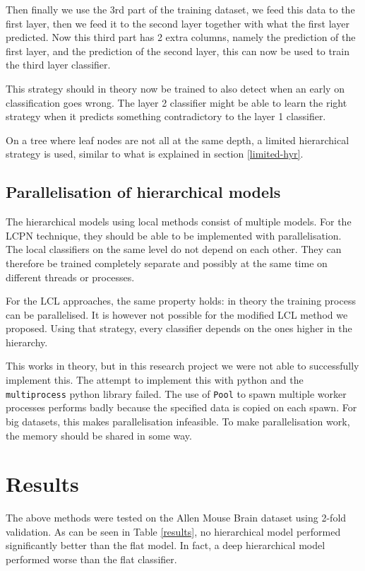 \documentclass{article}
\begin{document}
Then finally we use the 3rd part of the training dataset, we feed this data to the first layer, then we feed it to the second layer together with what the first layer predicted. 
Now this third part has 2 extra columns, namely the prediction of the first layer, and the prediction of the second layer, this can now be used to train the third layer classifier.

This strategy should in theory now be trained to also detect when an early on classification goes wrong. The layer 2 classifier might be able to learn the right strategy when it predicts something contradictory to the layer 1 classifier.

On a tree where leaf nodes are not all at the same depth, a limited hierarchical strategy is used, similar to what is explained in section \ref{limited-hyr}.


\subsection{Parallelisation of hierarchical models}

The hierarchical models using local methods consist of multiple models.
For the LCPN technique, they should be able to be implemented with parallelisation.
The local classifiers on the same level do not depend on each other.
They can therefore be trained completely separate and possibly at the same time on different threads or processes.

For the LCL approaches, the same property holds: in theory the training process can be parallelised.
It is however not possible for the modified LCL method we proposed.
Using that strategy, every classifier depends on the ones higher in the hierarchy.

This works in theory, but in this research project we were not able to successfully implement this.
The attempt to implement this with python and the \verb|multiprocess| python library \cite{multiprocessing1} \cite{multiprocessing2} failed.
The use of \verb|Pool| to spawn multiple worker processes performs badly because the specified data is copied on each spawn.
For big datasets, this makes parallelisation infeasible.
To make parallelisation work, the memory should be shared in some way.

\section{Results}

The above methods were tested on the Allen Mouse Brain dataset using 2-fold validation.
As can be seen in Table \ref{results}, no hierarchical model performed significantly better than the flat model. In fact, a deep hierarchical model performed worse than the flat classifier.
\end{document}
